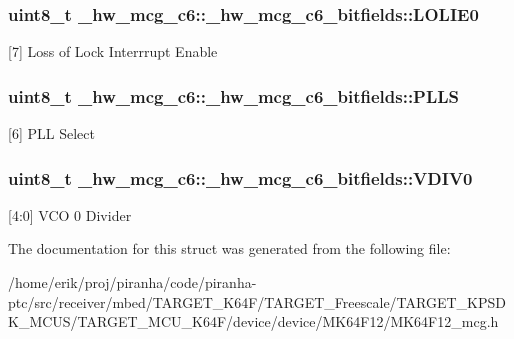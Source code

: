 \subsubsection[{\texorpdfstring{L\+O\+L\+I\+E0}{LOLIE0}}]{\setlength{\rightskip}{0pt plus 5cm}uint8\+\_\+t \+\_\+hw\+\_\+mcg\+\_\+c6\+::\+\_\+hw\+\_\+mcg\+\_\+c6\+\_\+bitfields\+::\+L\+O\+L\+I\+E0}\hypertarget{struct__hw__mcg__c6_1_1__hw__mcg__c6__bitfields_a11614fbaa5a28a0e7aee889a3e319f18}{}\label{struct__hw__mcg__c6_1_1__hw__mcg__c6__bitfields_a11614fbaa5a28a0e7aee889a3e319f18}
\mbox{[}7\mbox{]} Loss of Lock Interrrupt Enable 
\subsubsection[{\texorpdfstring{P\+L\+LS}{PLLS}}]{\setlength{\rightskip}{0pt plus 5cm}uint8\+\_\+t \+\_\+hw\+\_\+mcg\+\_\+c6\+::\+\_\+hw\+\_\+mcg\+\_\+c6\+\_\+bitfields\+::\+P\+L\+LS}\hypertarget{struct__hw__mcg__c6_1_1__hw__mcg__c6__bitfields_ad09e4a1a1823c7d92acd5f85753515d4}{}\label{struct__hw__mcg__c6_1_1__hw__mcg__c6__bitfields_ad09e4a1a1823c7d92acd5f85753515d4}
\mbox{[}6\mbox{]} P\+LL Select 
\subsubsection[{\texorpdfstring{V\+D\+I\+V0}{VDIV0}}]{\setlength{\rightskip}{0pt plus 5cm}uint8\+\_\+t \+\_\+hw\+\_\+mcg\+\_\+c6\+::\+\_\+hw\+\_\+mcg\+\_\+c6\+\_\+bitfields\+::\+V\+D\+I\+V0}\hypertarget{struct__hw__mcg__c6_1_1__hw__mcg__c6__bitfields_aedd6b51501c645debc38d60552324ca4}{}\label{struct__hw__mcg__c6_1_1__hw__mcg__c6__bitfields_aedd6b51501c645debc38d60552324ca4}
\mbox{[}4\+:0\mbox{]} V\+CO 0 Divider 

The documentation for this struct was generated from the following file\+:\begin{DoxyCompactItemize}
\item 
/home/erik/proj/piranha/code/piranha-\/ptc/src/receiver/mbed/\+T\+A\+R\+G\+E\+T\+\_\+\+K64\+F/\+T\+A\+R\+G\+E\+T\+\_\+\+Freescale/\+T\+A\+R\+G\+E\+T\+\_\+\+K\+P\+S\+D\+K\+\_\+\+M\+C\+U\+S/\+T\+A\+R\+G\+E\+T\+\_\+\+M\+C\+U\+\_\+\+K64\+F/device/device/\+M\+K64\+F12/M\+K64\+F12\+\_\+mcg.\+h\end{DoxyCompactItemize}
